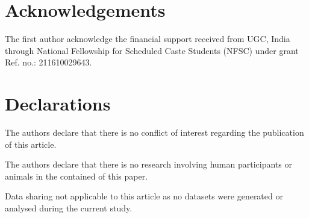 \documentclass[12pt]{article}
\renewcommand{\(}{\left\(}
\renewcommand{\)}{\right\)}
\renewcommand{\[}{\left[}
\renewcommand{\]}{\right]}
\numberwithin{equation}{section}
\theoremstyle{plain}
\begin{document}
		
		
\section*{Acknowledgements} The first author acknowledge the financial support received from UGC, India through National Fellowship for Scheduled Caste  Students (NFSC) under grant Ref. no.: 211610029643.
	
	\section*{\bf Declarations}
	 The authors declare that there is no conflict of interest regarding the publication of
	this article.
	
	 The authors declare that there is no research involving human participants or
	animals in the contained of this paper.	
	
	 Data sharing not applicable to this article as no datasets were generated or analysed during the current study.	
	
	
	
\end{document}
